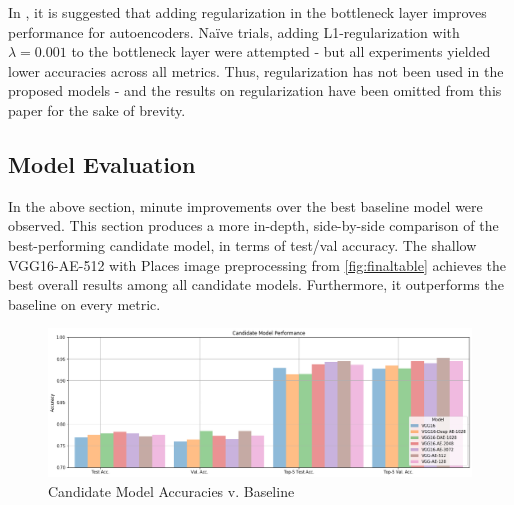 In , it is suggested that adding regularization in the bottleneck layer improves performance for autoencoders. 
Naïve trials, adding L1-regularization with $\lambda = 0.001$ to the bottleneck layer were attempted - but all experiments yielded lower accuracies across all metrics.
Thus, regularization has not been used in the proposed models - and the results on regularization have been omitted from this paper for the sake of brevity.

\subsection{Model Evaluation}
In the above section, minute improvements over the best baseline model were observed. 
This section produces a more in-depth, side-by-side comparison of the best-performing candidate model, in terms of test/val accuracy.
The shallow VGG16-AE-512 with Places image preprocessing from \autoref{fig:finaltable} achieves the best overall results among all candidate models. 
Furthermore, it outperforms the baseline on every metric.

\begin{figure}[H]
  \centering
    \includegraphics[width=\textwidth]{pictures/plots/final_cand_perf}
    \caption{Candidate Model Accuracies v. Baseline}
    \label{fig:candidates}
\end{figure}


